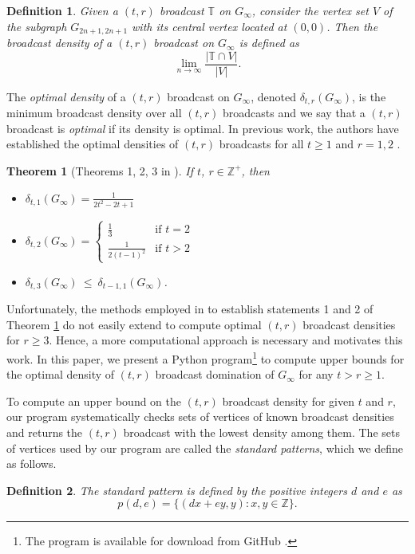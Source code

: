 \documentclass[12pt]{amsart}
\newtheorem{definition}{Definition}
\newtheorem{theorem}{Theorem}
\newcounter{x}
\newcounter{y}
\newcounter{x2}
\newcounter{y2}
\newcommand{\T}{
    \mathbb{T}
}
\begin{document}
\begin{definition}
Given a $(t,r)$ broadcast $\T$ on $G_\infty$, consider the vertex set $V$ of the subgraph $G_{2n+1, 2n+1}$ with its central vertex located at $(0, 0)$. Then the broadcast \emph{density} of a $(t,r)$ broadcast on $G_\infty$ is defined as $$\lim_{n \to \infty} \frac{|\T \cap V|}{|V|}.$$
\end{definition}
The \emph{optimal density} of a $(t,r)$ broadcast on $G_\infty$, denoted $\delta_{t,r}(G_{\infty})$, is the minimum broadcast density over all $(t,r)$ broadcasts and we say that a $(t,r)$ broadcast is \emph{optimal} if its density is optimal.
In previous work, the authors have established the optimal densities of $(t,r)$ broadcasts for all $t\geq 1$ and  $r=1,2$ \cite{DHR}.

\begin{theorem}[Theorems 1, 2, 3 in \cite{DHR}]\label{thm:main} If $t$, $r \in \mathbb{Z}^+$, then
\begin{itemize}
\item $\delta_{t,1}(G_{\infty}) = \frac{1}{2t^2 - 2t + 1}$
\item $\delta_{t,2}(G_{\infty}) = \begin{cases}\frac{1}{3}&\mbox{if $t=2$}\\\frac{1}{2(t-1)^2}&\mbox{if $t>2$}\end{cases}$
\item $\delta_{t,3}(G_\infty) \ \leq \ \delta_{t-1,1}(G_\infty)$.
\end{itemize}
\end{theorem}

Unfortunately, the methods employed in \cite{DHR} to establish statements 1 and 2 of Theorem \ref{thm:main} do not easily extend to compute optimal $(t,r)$ broadcast densities for $r\geq 3$. Hence, a more computational approach is necessary and motivates this work. In this paper, we present a Python program\footnote{The program is available for download from GitHub \cite{DHRprogram}.} to compute upper bounds for the optimal density of $(t,r)$ broadcast domination of $G_\infty$ for any $t>r\geq 1$. 

To compute an upper bound on the $(t,r)$ broadcast density for given $t$ and $r$, our program systematically checks sets of vertices of known broadcast densities and returns the $(t,r)$ broadcast with the lowest density among them. The sets of vertices used by our program are called the \emph{standard patterns}, which we define as follows.

\begin{definition}
The \emph{standard pattern} is defined by the positive integers $d$ and $e$ as
\[p(d,e) = \{(dx+ey, y) : x,y \in \mathbb{Z}\}.\]
\end{definition}
\end{document}
